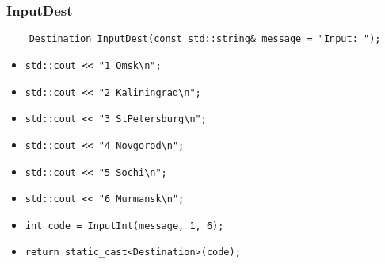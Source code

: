 \subsubsection{InputDest}

\begin{lstlisting}
    Destination InputDest(const std::string& message = "Input: ");
\end{lstlisting}

\begin{itemize}
    \item \verb|std::cout << "1 Omsk\n";|
    \item \verb|std::cout << "2 Kaliningrad\n";|
    \item \verb|std::cout << "3 StPetersburg\n";|
    \item \verb|std::cout << "4 Novgorod\n";|
    \item \verb|std::cout << "5 Sochi\n";|
    \item \verb|std::cout << "6 Murmansk\n";|
    \item \verb|int code = InputInt(message, 1, 6);|
    \item \verb|return static_cast<Destination>(code);|
\end{itemize}

